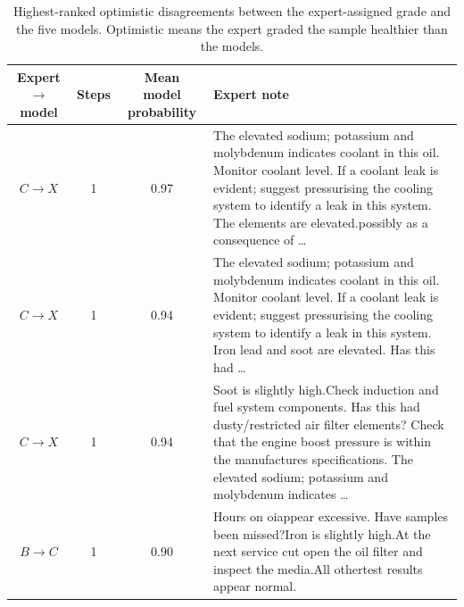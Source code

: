 \begin{table}[t]
\centering
\small
\caption{Highest-ranked optimistic disagreements between the expert-assigned grade and the five models. Optimistic means the expert graded the sample healthier than the models.}
\label{tab:optimistic_disagreements}
\begin{tabularx}{\linewidth}{c c c X}
\hline
Expert $\rightarrow$ model & Steps & Mean model probability & Expert note \\
\hline
$C \rightarrow X$ & 1 & 0.97 &
The elevated sodium; potassium and molybdenum indicates coolant in this oil. Monitor coolant level. If a coolant leak is evident; suggest pressurising the cooling system to identify a leak in this system. The elements are elevated.possibly as a consequence of \ldots \\
$C \rightarrow X$ & 1 & 0.94 &
The elevated sodium; potassium and molybdenum indicates coolant in this oil. Monitor coolant level. If a coolant leak is evident; suggest pressurising the cooling system to identify a leak in this system. Iron lead and soot are elevated. Has this had \ldots \\
$C \rightarrow X$ & 1 & 0.94 &
Soot is slightly high.Check induction and fuel system components. Has this had dusty/restricted air filter elements? Check that the engine boost pressure is within the manufactures specifications. The elevated sodium; potassium and molybdenum indicates \ldots \\
$B \rightarrow C$ & 1 & 0.90 &
Hours on oiappear excessive. Have samples been missed?Iron is slightly high.At the next service cut open the oil filter and inspect the media.All othertest results appear normal. \\
\hline
\end{tabularx}
\end{table}

